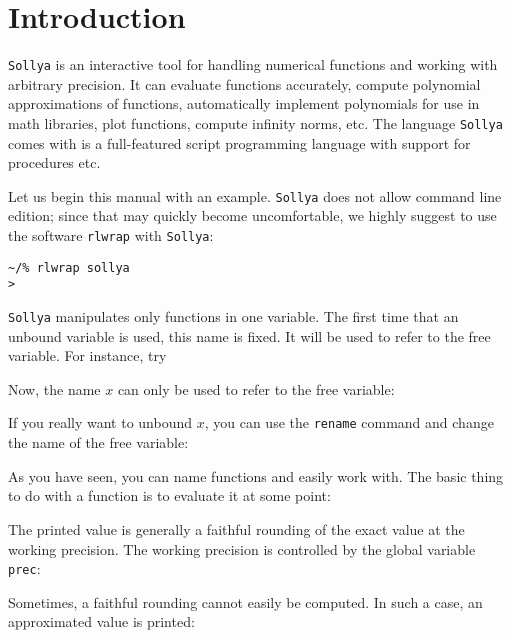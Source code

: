 \documentclass[a4paper]{article}
\newcommand{\com}[1]{\texttt{#1}}
\newcommand{\sollya}{\texttt{Sollya}\xspace}
\newcommand{\rlwrap}{\texttt{rlwrap}\xspace}
\begin{document}
\section{Introduction}
\sollya is an interactive tool for handling numerical functions and working with arbitrary precision. It can evaluate functions accurately, compute polynomial approximations of functions, automatically implement polynomials for use in math libraries, plot functions, compute infinity norms, etc. The language \sollya comes with is a full-featured script programming language with support for procedures etc. 

Let us begin this manual with an example. \sollya does not allow command line edition; since that may quickly become uncomfortable, we highly suggest to use the software \rlwrap with \sollya:

\begin{center}\begin{minipage}{15cm}\begin{Verbatim}[frame=single]
~/% rlwrap sollya
>
\end{Verbatim}
\end{minipage}\end{center}

\sollya manipulates only functions in one variable. The first time that an unbound variable is used, this name is fixed. It will be used to refer to the free variable. For instance, try



Now, the name $x$ can only be used to refer to the free variable:



If you really want to unbound $x$, you can use the \com{rename} command and change the name of the free variable:



As you have seen, you can name functions and easily work with. The basic thing to do with a function is to evaluate it at some point:



The printed value is generally a faithful rounding of the exact value at the working precision. The working precision is controlled by the global variable \com{prec}:



Sometimes, a faithful rounding cannot easily be computed. In such a case, an approximated value is printed:
\end{document}
